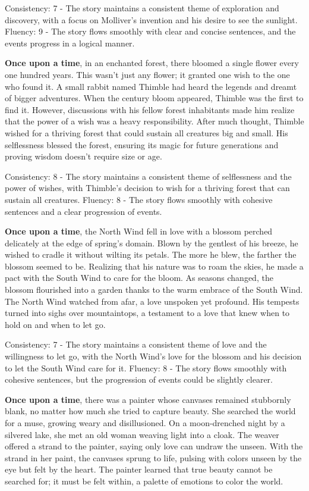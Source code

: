 \documentclass{article}
\begin{document}
Consistency: 7 - The story maintains a consistent theme of exploration and discovery, with a focus on Molliver's invention and his desire to see the sunlight.
Fluency: 9 - The story flows smoothly with clear and concise sentences, and the events progress in a logical manner.

\textbf{Once upon a time}, in an enchanted forest, there bloomed a single flower every one hundred years. This wasn't just any flower; it granted one wish to the one who found it. A small rabbit named Thimble had heard the legends and dreamt of bigger adventures. When the century bloom appeared, Thimble was the first to find it. However, discussions with his fellow forest inhabitants made him realize that the power of a wish was a heavy responsibility. After much thought, Thimble wished for a thriving forest that could sustain all creatures big and small. His selflessness blessed the forest, ensuring its magic for future generations and proving wisdom doesn't require size or age.

Consistency: 8 - The story maintains a consistent theme of selflessness and the power of wishes, with Thimble's decision to wish for a thriving forest that can sustain all creatures.
Fluency: 8 - The story flows smoothly with cohesive sentences and a clear progression of events.

\textbf{Once upon a time}, the North Wind fell in love with a blossom perched delicately at the edge of spring's domain. Blown by the gentlest of his breeze, he wished to cradle it without wilting its petals. The more he blew, the farther the blossom seemed to be. Realizing that his nature was to roam the skies, he made a pact with the South Wind to care for the bloom. As seasons changed, the blossom flourished into a garden thanks to the warm embrace of the South Wind. The North Wind watched from afar, a love unspoken yet profound. His tempests turned into sighs over mountaintops, a testament to a love that knew when to hold on and when to let go.

Consistency: 7 - The story maintains a consistent theme of love and the willingness to let go, with the North Wind's love for the blossom and his decision to let the South Wind care for it.
Fluency: 8 - The story flows smoothly with cohesive sentences, but the progression of events could be slightly clearer.

\textbf{Once upon a time}, there was a painter whose canvases remained stubbornly blank, no matter how much she tried to capture beauty. She searched the world for a muse, growing weary and disillusioned. On a moon-drenched night by a silvered lake, she met an old woman weaving light into a cloak. The weaver offered a strand to the painter, saying only love can undraw the unseen. With the strand in her paint, the canvases sprung to life, pulsing with colors unseen by the eye but felt by the heart. The painter learned that true beauty cannot be searched for; it must be felt within, a palette of emotions to color the world.
\end{document}
